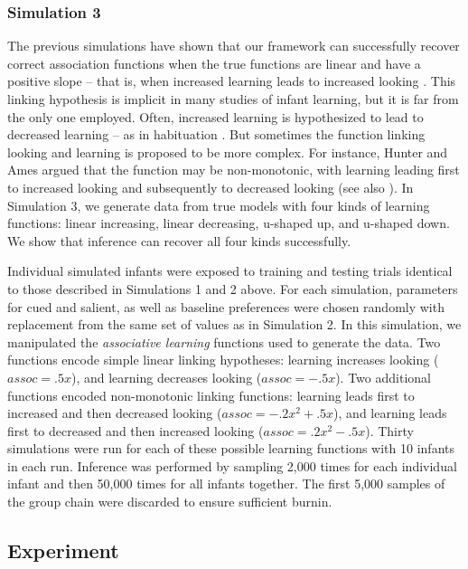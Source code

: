 \documentclass[12pt]{article}
\begin{document}
\subsubsection{Simulation 3}

	The previous simulations have shown that our framework can successfully recover correct association functions when the true functions are linear and have a positive slope – that is, when increased learning leads to increased looking \cite{Yu2011a}. This linking hypothesis is implicit in many studies of infant learning, but it is far from the only one employed. Often, increased learning is hypothesized to lead to decreased learning – as in habituation \cite{Fantz1964, Stager1997, Gilmore2002}. But sometimes the function linking looking and learning is proposed to be more complex. For instance, Hunter and Ames \cite{Hunter1988} argued that the function may be non-monotonic, with learning leading first to increased looking and subsequently to decreased looking (see also \cite{Cohen2004, Houston-Price2004}). In Simulation 3, we generate data from true models with four kinds of learning functions: linear increasing, linear decreasing, u-shaped up, and u-shaped down. We show that inference can recover all four kinds successfully. 

	Individual simulated infants were exposed to training and testing trials identical to those described in Simulations 1 and 2 above. For each simulation, parameters for cued and salient, as well as baseline preferences were chosen randomly with replacement from the same set of values as in Simulation 2. In this simulation, we manipulated the \emph{associative learning} functions used to generate the data. Two functions encode simple linear linking hypotheses: learning increases looking ($assoc = .5x$), and learning decreases looking ($assoc = -.5x$). Two additional functions encoded non-monotonic linking functions: learning leads first to increased and then decreased looking ($assoc = -.2x^{2} + .5x$), and learning leads first to decreased and then increased looking ($assoc = .2x^{2} - .5x$). Thirty simulations were run for each of these possible learning functions with 10 infants in each run. Inference was performed by sampling 2,000 times for each individual infant and then 50,000 times for all infants together. The first 5,000 samples of the group chain were discarded to ensure sufficient burnin.

\subsection*{Experiment}
\end{document}
